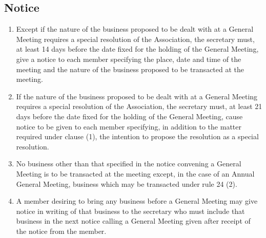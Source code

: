 \documentclass{article}
\begin{document}
\subsection{Notice}
\begin{enumerate}
  \item Except if the nature of the business proposed to be dealt with at a General Meeting requires a special resolution of the Association, the secretary must, at least 14 days before the date fixed for the holding of the General Meeting, give a notice to each member specifying the place, date and time of the meeting and the nature of the business proposed to be transacted at the meeting.
  \item If the nature of the business proposed to be dealt with at a General Meeting requires a special resolution of the Association, the secretary must, at least 21 days before the date fixed for the holding of the General Meeting, cause notice to be given to each member specifying, in addition to the matter required under clause (1), the intention to propose the resolution as a special resolution.
  \item No business other than that specified in the notice convening a General Meeting is to be transacted at the meeting except, in the case of an Annual General Meeting, business which may be transacted under rule 24 (2).
  \item A member desiring to bring any business before a General Meeting may give notice in writing of that business to the secretary who must include that business in the next notice calling a General Meeting given after receipt of the notice from the member.
\end{enumerate}
\end{document}
